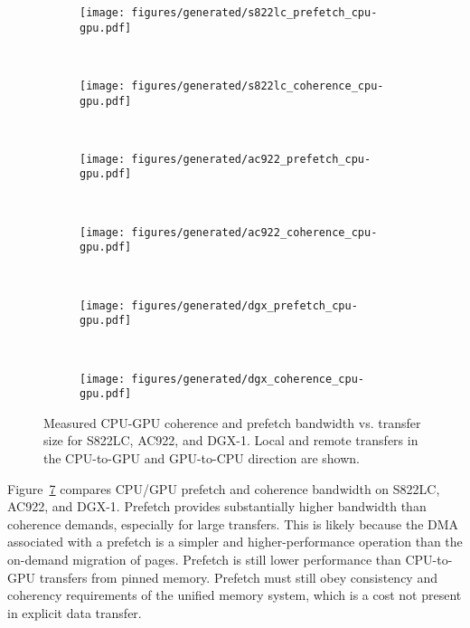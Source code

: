 \begin{figure}[H]
	\centering
	\begin{subfigure}[b]{0.45\textwidth}
		\texttt{[image: figures/generated/s822lc\_prefetch\_cpu-gpu.pdf]}
		\caption{}
		\label{fig:um-prefetch-s822lc-cpu-gpu}
	\end{subfigure}
	~
	\begin{subfigure}[b]{0.45\textwidth}
		\texttt{[image: figures/generated/s822lc\_coherence\_cpu-gpu.pdf]}
		\caption{}
		\label{fig:um-coherence-s822lc-cpu-gpu}
	\end{subfigure}
	\\
	\begin{subfigure}[b]{0.45\textwidth}
		\texttt{[image: figures/generated/ac922\_prefetch\_cpu-gpu.pdf]}
		\caption{}
		\label{fig:um-prefetch-ac922-cpu-gpu}
	\end{subfigure}
	~
	\begin{subfigure}[b]{0.45\textwidth}
		\texttt{[image: figures/generated/ac922\_coherence\_cpu-gpu.pdf]}
		\caption{}
		\label{fig:um-coherence-ac922-cpu-gpu}
	\end{subfigure}
	\\
	\begin{subfigure}[b]{0.45\textwidth}
		\texttt{[image: figures/generated/dgx\_prefetch\_cpu-gpu.pdf]}
		\caption{}
		\label{fig:um-prefetch-dgx-cpu-gpu}
	\end{subfigure}
	~
	\begin{subfigure}[b]{0.45\textwidth}
		\texttt{[image: figures/generated/dgx\_coherence\_cpu-gpu.pdf]}
		\caption{}
		\label{fig:um-coherence-dgx-cpu-gpu}
	\end{subfigure}
	\caption[CPU/GPU Coherence and Prefetch Bandwidth]{
		Measured CPU-GPU coherence and prefetch bandwidth vs. transfer size  for S822LC, AC922, and DGX-1.
		Local and remote transfers in the CPU-to-GPU and GPU-to-CPU direction are shown.
	}
	\label{fig:um-cpu-gpu}
\end{figure}

Figure~\ref{fig:um-cpu-gpu} compares CPU/GPU prefetch and coherence bandwidth on S822LC, AC922, and DGX-1.
Prefetch provides substantially higher bandwidth than coherence demands, especially for large transfers.
This is likely because the DMA associated with a prefetch is a simpler and higher-performance operation than the on-demand migration of pages.
Prefetch is still lower performance than CPU-to-GPU transfers from pinned memory.
Prefetch must still obey consistency and coherency requirements of the unified memory system, which is a cost not present in explicit data transfer.

